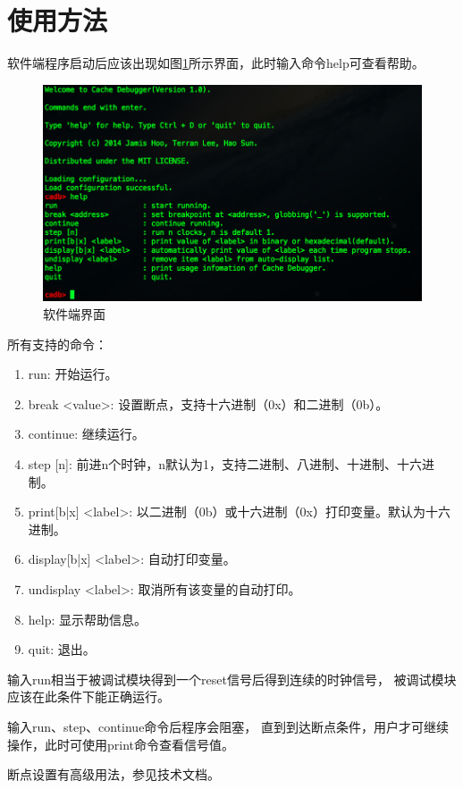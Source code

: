 \section{使用方法}
    软件端程序启动后应该出现如图\ref{client}所示界面，此时输入命令help可查看帮助。

    \begin{figure}[!hbp]
            \caption{软件端界面}\label{client}
            \centering
            \includegraphics[width=\textwidth]{chart/cadb_client}
    \end{figure}

    所有支持的命令：
    \begin{enumerate}
    \item
    run: 开始运行。
    \item
    break <value>: 设置断点，支持十六进制（0x）和二进制（0b）。
    \item
    continue: 继续运行。
    \item
    step [n]: 前进n个时钟，n默认为1，支持二进制、八进制、十进制、十六进制。
    \item
    print[b|x] <label>: 以二进制（0b）或十六进制（0x）打印变量。默认为十六进制。
    \item
    display[b|x] <label>: 自动打印变量。
    \item
    undisplay <label>: 取消所有该变量的自动打印。
    \item
    help: 显示帮助信息。
    \item
    quit: 退出。
    \end{enumerate}

    输入run相当于被调试模块得到一个reset信号后得到连续的时钟信号，%
    被调试模块应该在此条件下能正确运行。

    输入run、step、continue命令后程序会阻塞，%
    直到到达断点条件，用户才可继续操作，此时可使用print命令查看信号值。

    断点设置有高级用法，参见技术文档。

